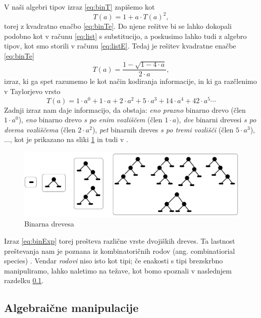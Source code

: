 \documentclass[a4paper, 12pt]{book}
\begin{document}
V naši algebri tipov izraz \eqref{eq:binT} zapišemo kot
\begin{equation}
\label{eq:binTe}
T(a)=1+a\cdot T(a)^2,
\end{equation}
torej z kvadratno enačbo \eqref{eq:binTe}. Do njene rešitve bi se lahko dokopali podobno kot v računu \eqref{eq:list} s substitucijo, a poskusimo lahko tudi z algebro tipov, kot smo storili v računu \eqref{eq:listE}. Tedaj je rešitev kvadratne enačbe \eqref{eq:binTe}
\begin{equation}
T(a)=\frac{1-\sqrt{1-4\cdot a}}{2\cdot a}, \label{eq:binTeQ}
\end{equation}
izraz, ki ga spet razumemo le kot način kodiranja informacije, in ki ga razčlenimo v Taylorjevo vrsto
\begin{equation}
T(a)=1\cdot a^0+1\cdot a+2\cdot a^2 + 5\cdot a^3+ 14\cdot a^4 + 42\cdot a^5\cdots \label{eq:binExp}
\end{equation}
Zadnji izraz nam daje informacijo, da obstaja: \emph{eno prazno} binarno drevo (člen $1\cdot a^0$), \emph{eno} binarno drevo \emph{s po enim vozliščem} (člen $1\cdot a$), \emph{dve} binarni drevesi \emph{s po dvema vozliščema} (člen $2\cdot a^2$), \emph{pet} binarnih dreves \emph{s po tremi vozlišči} (člen $5\cdot a^3$), $\dots$, kot je prikazano na sliki \ref{fig:trees} in tudi v \cite{analComb}.
\begin{figure}
\begin{center}
\includegraphics[width=\linewidth]{imgs/bintrees.png}
\end{center}
\caption{Binarna drevesa}
\label{fig:trees}
\end{figure}

Izraz \eqref{eq:binExp} torej prešteva različne vrste dvojiških dreves. Ta lastnost preštevanja nam je poznana iz kombinatoričnih rodov (ang. combinatiorial species) \cite{species}. Vendar \emph{rodovi} niso isto kot tipi; če enakosti s tipi brezskrbno manipuliramo, lahko naletimo na težave, kot bomo spoznali v naslednjem razdelku \ref{ch:algMani}.


\subsection{Algebraične manipulacije}\label{ch:algMani}
\end{document}
